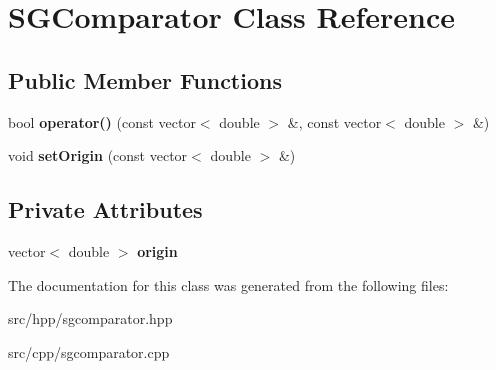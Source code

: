 \hypertarget{classSGComparator}{\section{S\-G\-Comparator Class Reference}
\label{classSGComparator}
}
\subsection*{Public Member Functions}
\begin{DoxyCompactItemize}
\item 
\hypertarget{classSGComparator_a16f872e1006a2a0f961c2d75f76eb09b}{bool {\bfseries operator()} (const vector$<$ double $>$ \&, const vector$<$ double $>$ \&)}\label{classSGComparator_a16f872e1006a2a0f961c2d75f76eb09b}

\item 
\hypertarget{classSGComparator_a8d148427c21d0e7d1283b368548c0a28}{void {\bfseries set\-Origin} (const vector$<$ double $>$ \&)}\label{classSGComparator_a8d148427c21d0e7d1283b368548c0a28}

\end{DoxyCompactItemize}
\subsection*{Private Attributes}
\begin{DoxyCompactItemize}
\item 
\hypertarget{classSGComparator_a7a41e74bc94593a9acbe9e21b6155310}{vector$<$ double $>$ {\bfseries origin}}\label{classSGComparator_a7a41e74bc94593a9acbe9e21b6155310}

\end{DoxyCompactItemize}


The documentation for this class was generated from the following files\-:\begin{DoxyCompactItemize}
\item 
src/hpp/sgcomparator.\-hpp\item 
src/cpp/sgcomparator.\-cpp\end{DoxyCompactItemize}
